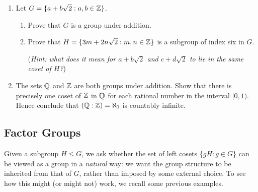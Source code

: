 \begin{exercises}
\begin{enumerate}
			
		\item\label{exs:zsqrt2subgroup} Let $G=\{a+b\sqrt 2:a,b\in\mathbb{Z}\}$.
		\begin{enumerate}
		  \item Prove that $G$ is a group under addition.
		  \item Prove that $H=\{3m+2n\sqrt 2:m,n\in\mathbb{Z}\}$ is a subgroup of index six in $G$.\par
		  (\emph{Hint: what does it mean for $a+b\sqrt 2$ and $c+d\sqrt 2$ to lie in the same coset of $H$?})
		\end{enumerate}
	  
	  \item\label{exs:zqindex} The sets $\mathbb{Q}$ and $\mathbb{Z}$ are both groups under addition. Show that there is precisely one coset of $\mathbb{Z}$ in $\mathbb{Q}$ for each rational number in the interval $[0,1)$. Hence conclude that $(\mathbb{Q}:\mathbb{Z})=\aleph_0$ is countably infinite.
	
	\end{enumerate}
\end{exercises}


\clearpage

\subsection{Factor Groups}\label{sec:factor}

Given a subgroup $H\le G$, we ask whether the set of left cosets $\{gH:g\in G\}$ can be viewed as a group in a \emph{natural} way: we want the group structure to be inherited from that of $G$, rather than imposed by some external choice. To see how this might (or might not) work, we recall some previous examples.

